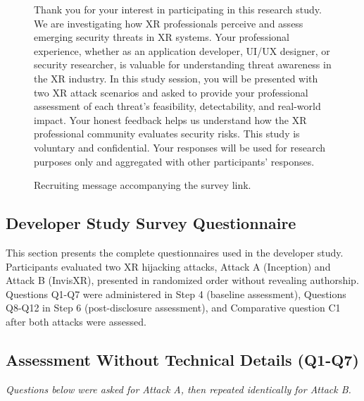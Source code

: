 \documentclass[letterpaper,twocolumn,10pt]{article}
\begin{document}
\begin{figure}[h]
    \centering
    \begin{tcolorbox}[
        enhanced,
        colback=gray!5!white,
        colframe=gray!75!black,
        left=2pt,right=2pt,top=2pt,bottom=2pt,
        boxrule=0.3pt,
        arc=2pt,
        fontupper=\small\itshape
    ]
Thank you for your interest in participating in this research study. We are investigating how XR professionals perceive and assess emerging security threats in XR systems. Your professional experience, whether as an application developer, UI/UX designer, or security researcher, is valuable for understanding threat awareness in the XR industry. In this study session, you will be presented with two XR attack scenarios and asked to provide your professional assessment of each threat's feasibility, detectability, and real-world impact. Your honest feedback helps us understand how the XR professional community evaluates security risks. This study is voluntary and confidential. Your responses will be used for research purposes only and aggregated with other participants' responses.
\end{tcolorbox}
    \caption{Recruiting message accompanying the survey link.}
    \label{fig:sms}
\end{figure}

\subsection{Developer Study Survey Questionnaire}
\label{sec:devStudySurvey}

This section presents the complete questionnaires used in the developer study. Participants evaluated two XR hijacking attacks, Attack A (Inception) and Attack B (InvisXR), presented in randomized order without revealing authorship. Questions Q1-Q7 were administered in Step 4 (baseline assessment), Questions Q8-Q12 in Step 6 (post-disclosure assessment), and Comparative question C1 after both attacks were assessed.

\subsection{Assessment Without Technical Details (Q1-Q7)}
\textit{Questions below were asked for Attack A, then repeated identically for Attack B.}
\end{document}
